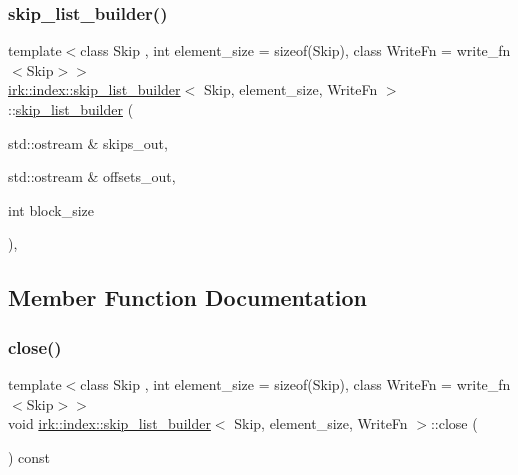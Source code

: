 \subsubsection{\texorpdfstring{skip\+\_\+list\+\_\+builder()}{skip\_list\_builder()}}
{\footnotesize\ttfamily template$<$class Skip , int element\+\_\+size = sizeof(\+Skip), class Write\+Fn  = write\+\_\+fn$<$\+Skip$>$$>$ \\
\mbox{\hyperlink{classirk_1_1index_1_1skip__list__builder}{irk\+::index\+::skip\+\_\+list\+\_\+builder}}$<$ Skip, element\+\_\+size, Write\+Fn $>$\+::\mbox{\hyperlink{classirk_1_1index_1_1skip__list__builder}{skip\+\_\+list\+\_\+builder}} (\begin{DoxyParamCaption}\item[{std\+::ostream \&}]{skips\+\_\+out,  }\item[{std\+::ostream \&}]{offsets\+\_\+out,  }\item[{int}]{block\+\_\+size }\end{DoxyParamCaption})\hspace{0.3cm}{\ttfamily [inline]}, {\ttfamily [noexcept]}}



\subsection{Member Function Documentation}
\mbox{\label{classirk_1_1index_1_1skip__list__builder_afddff8af3fc2fdd09950ae6036b2bc0c}} 
\subsubsection{\texorpdfstring{close()}{close()}}
{\footnotesize\ttfamily template$<$class Skip , int element\+\_\+size = sizeof(\+Skip), class Write\+Fn  = write\+\_\+fn$<$\+Skip$>$$>$ \\
void \mbox{\hyperlink{classirk_1_1index_1_1skip__list__builder}{irk\+::index\+::skip\+\_\+list\+\_\+builder}}$<$ Skip, element\+\_\+size, Write\+Fn $>$\+::close (\begin{DoxyParamCaption}{ }\end{DoxyParamCaption}) const\hspace{0.3cm}{\ttfamily [inline]}}

